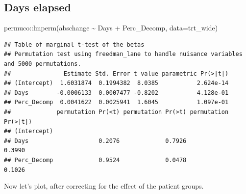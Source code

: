 \documentclass[
]{article}
\newenvironment{Shaded}{\begin{snugshade}}{\end{snugshade}}
\newcommand{\AttributeTok}[1]{\textcolor[rgb]{0.77,0.63,0.00}{#1}}
\newcommand{\FunctionTok}[1]{\textcolor[rgb]{0.00,0.00,0.00}{#1}}
\newcommand{\NormalTok}[1]{#1}
\newcommand{\SpecialCharTok}[1]{\textcolor[rgb]{0.00,0.00,0.00}{#1}}
\begin{document}
\hypertarget{days-elapsed}{%
\subsection{Days elapsed}\label{days-elapsed}}

\begin{Shaded}
\begin{Highlighting}[]
\NormalTok{permuco}\SpecialCharTok{::}\FunctionTok{lmperm}\NormalTok{(abschange }\SpecialCharTok{\textasciitilde{}}\NormalTok{ Days }\SpecialCharTok{+}\NormalTok{ Perc\_Decomp, }\AttributeTok{data=}\NormalTok{trt\_wide)}
\end{Highlighting}
\end{Shaded}

\begin{verbatim}
## Table of marginal t-test of the betas
## Permutation test using freedman_lane to handle nuisance variables and 5000 permutations.
##               Estimate Std. Error t value parametric Pr(>|t|)
## (Intercept)  1.6031874  0.1994382  8.0385           2.624e-14
## Days        -0.0006133  0.0007477 -0.8202           4.128e-01
## Perc_Decomp  0.0041622  0.0025941  1.6045           1.097e-01
##             permutation Pr(<t) permutation Pr(>t) permutation Pr(>|t|)
## (Intercept)                                                           
## Days                    0.2076             0.7926               0.3990
## Perc_Decomp             0.9524             0.0478               0.1026
\end{verbatim}

Now let's plot, after correcting for the effect of the patient groups.
\end{document}
